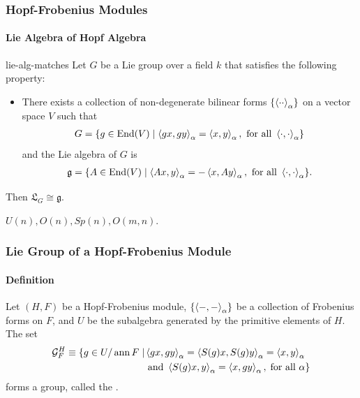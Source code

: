 \documentclass{beamer}
\begin{document}
\begin{frame}

\frametitle{Hopf-Frobenius Modules}

\framesubtitle{Lie Algebra of Hopf Algebra}




\begin{prop}{}{lie-alg-matches}
Let $G$ be a Lie group over a field $k$ that satisfies the following property: 

\begin{itemize}
\item There exists a collection of non-degenerate bilinear forms $\{ \left\langle \cdot \cdot \right\rangle_\alpha \}$ on a vector space $V$ such that 
\begin{align*}
G = \{ g \in \operatorname{End}(V) \mid \left\langle g x, gy \right\rangle_\alpha = \left\langle x,y \right\rangle_\alpha, \text{ for all } \left\langle \cdot, \cdot \right\rangle_\alpha \}
\end{align*}
and the Lie algebra of $G$ is
\begin{align*}
\mathfrak{g} = \{ A \in \operatorname{End}(V) \mid \left\langle Ax, y \right\rangle_{\alpha} = - \left\langle x, Ay \right\rangle_{\alpha}, \text{ for all } \left\langle \cdot, \cdot \right\rangle_\alpha \}.
\end{align*}
\end{itemize}

Then $\mathfrak{L}_G \cong \mathfrak{g}$.
%
%
\end{prop}


 $U(n), O(n), Sp(n), O(m,n)$.


\end{frame}





\begin{frame}

\frametitle{Lie Group of a Hopf-Frobenius Module}

\framesubtitle{Definition}


Let $(H,F)$ be a Hopf-Frobenius module, $\{ \left\langle -,- \right\rangle_\alpha \}$ be a collection of Frobenius forms on $F$, and $U$ be the subalgebra generated by the primitive elements of $H$. The set
\begin{align*}
\mathcal{G}^H_F \equiv \{ g \in U/\operatorname{ann} F \mid &\left\langle g x, gy \right\rangle_\alpha = \left\langle S(g) x, S(g) y \right\rangle_\alpha = \left\langle x,y \right\rangle_\alpha \\
 &\text{ and } \left\langle S(g) x, y \right\rangle_\alpha = \left\langle x, g y \right\rangle_\alpha, \; \text{for all } \alpha \}
\end{align*}
forms a group, called the .


\end{frame}
\end{document}
